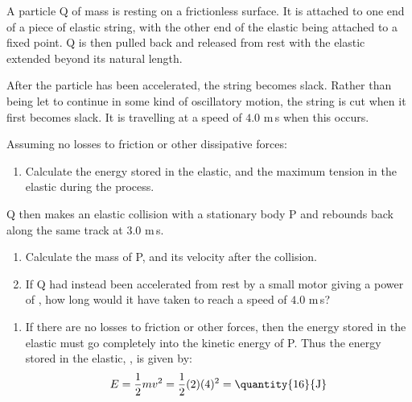
\begin{problem}[AO1984PIQ1a]
{A particle Q of mass  is resting on a frictionless surface. It is attached to one end of a piece of elastic string, with the other end of the elastic being attached to a fixed point. Q is then pulled back and released from rest with the elastic extended  beyond its natural length. 

After the particle has been accelerated, the string becomes slack. Rather than being let to continue in some kind of oscillatory motion, the string is cut when it first becomes slack. It is travelling at a speed of $4.0$ {m\,s} when this occurs.

Assuming no losses to friction or other dissipative forces:
\begin{enumerate}
	\item Calculate the energy stored in the elastic, and the maximum tension in the elastic during the process.
\end{enumerate}
Q then makes an elastic collision with a stationary body P and rebounds back along the same track at $3.0$ m\,s. 
\begin{enumerate}[resume]
	\item Calculate the mass of P, and its velocity after the collision.
	\item If Q had instead been accelerated from rest by a small motor giving a power of , how long would it have taken to reach a speed of $4.0$ {m\,s}?
\end{enumerate}
\vspace{-0.4cm}
}
{}
{\begin{enumerate}
	\item If there are no losses to friction or other forces, then the energy stored in the elastic must go completely into the kinetic energy of P. Thus the energy stored in the elastic, , is given by:
\begin{align*} 
E = \frac{1}{2}mv^{2} = \frac{1}{2}(2)(4)^{2} = \mbox{\quantity{16}{J}} 
\end{align*}


\end{enumerate}}
\end{problem}
